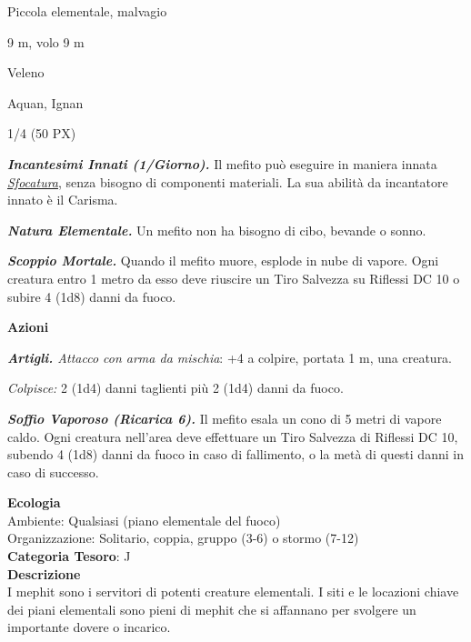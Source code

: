\begin{multicols}{2}
{
\begin{description}[noitemsep, topsep=0pt, parsep=0pt, partopsep=0pt, itemsep=1pt, leftmargin=2.35cm,  labelwidth=2.2cm, itemindent=0cm, listparindent=0pt] %
\setlength{\baselineskip}{10pt}
\item[\textbf{Taglia/Tipo}] Piccola elementale, malvagio
\item[\textbf{Caratt.}] 
\item[\textbf{Punti Ferita}] 
\item[\textbf{Movimento}] 9 m, volo 9 m
\item[\textbf{Tiri Salvez.}] 
\item[\textbf{Imm. Danni}] Veleno
\item[\textbf{Sensi}] 
\item[\textbf{Linguaggi}] Aquan, Ignan
\item[\textbf{Sfida}] 1/4 (50 PX)
\end{description}
\smallskip

\emph{\textbf{Incantesimi Innati (1/Giorno).}} Il mefito può eseguire in maniera innata \emph{\hyperlink{Sfocatura}{Sfocatura}}, senza bisogno di componenti materiali. La sua abilità da incantatore innato è il Carisma.

\emph{\textbf{Natura Elementale.}} Un mefito non ha bisogno di cibo, bevande o sonno.

\emph{\textbf{Scoppio Mortale.}} Quando il mefito muore, esplode in nube di vapore. Ogni creatura entro 1 metro da esso deve riuscire un Tiro Salvezza su Riflessi DC 10 o subire 4 (1d8) danni da fuoco.

\textbf{Azioni}

\emph{\textbf{Artigli.} Attacco con arma da mischia}: +4 a colpire, portata 1 m, una creatura.

\emph{Colpisce:} 2 (1d4) danni taglienti più 2 (1d4) danni da fuoco.

\emph{\textbf{Soffio Vaporoso (Ricarica 6).}} Il mefito esala un cono di 5 metri di vapore caldo. Ogni creatura nell'area deve effettuare un Tiro Salvezza di Riflessi DC 10, subendo 4 (1d8) danni da fuoco in caso di fallimento, o la metà di questi danni in caso di successo.

\textbf{Ecologia}\\
Ambiente: Qualsiasi (piano elementale del fuoco)\\
Organizzazione: Solitario, coppia, gruppo (3-6) o stormo (7-12)\\
\textbf{Categoria Tesoro}: J\\
\textbf{Descrizione}\\
I mephit sono i servitori di potenti creature elementali. I siti e le locazioni chiave dei piani elementali sono pieni di mephit che si affannano per svolgere un importante dovere o incarico.

}
\end{multicols}
